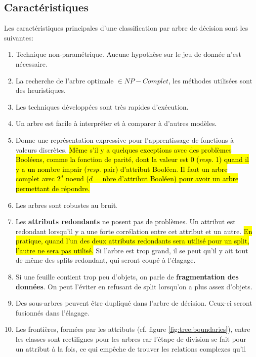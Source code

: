 \documentclass[letterpaper, 12pt]{article}
\newcommand{\alinea}{
\hspace*{0.5cm}}
\begin{document}
		\subsection{Caractéristiques}
			\alinea Les caractéristiques principales d'une classification
				par arbre de décision sont les suivantes:
			\begin{enumerate}
				\item Technique non-paramétrique. Aucune hypothèse sur le
					jeu de donnée n'est nécessaire.
				\item La recherche de l'arbre optimale $\in NP-Complet$,
					les méthodes utilisées sont des heuristiques.
				\item Les techniques développées sont très rapides 
					d'exécution.
				\item Un arbre est facile à interpréter et à comparer
					à d'autres modèles.
				\item Donne une représentation expressive pour l'apprentissage
					de fonctions à valeurs discrètes. \hl{Même s'il y a
					quelques exceptions avec des problèmes Booléens, comme
					la fonction de parité, dont la valeur est 0
					(\textit{resp.} 1) quand il y a un nombre impair 
					(\textit{resp.} pair) d'attribut Booléen. Il faut
					un arbre complet avec $2^d$ noeud ($d$ = nbre d'attribut
					Booléen) pour avoir un arbre permettant de répondre.}
				\item Les arbres sont robustes au bruit.
				\item Les \textbf{attributs redondants} ne posent pas 
					de problèmes. Un attribut est redondant lorsqu'il y a une
					forte corrélation entre cet attribut et un autre.
					\hl{En pratique, quand l'un des deux attributs redondants
					sera utilisé pour un split, l'autre ne sera pas utilisé.}
					Si l'arbre est trop grand, il se peut qu'il y ait tout
					de même des splits redondant, qui seront coupé à l'élagage.
				\item Si une feuille contient trop peu d'objets, on parle
					de \textbf{fragmentation des données}. On peut l'éviter
					en refusant de split lorsqu'on a plus assez d'objets.
				\item Des sous-arbres peuvent être dupliqué dans l'arbre
					de décision. Ceux-ci seront fusionnés dans l'élagage.
				\item Les frontières, formées par les attributs (cf. figure
					\ref{fig:tree:boundaries}), 
					entre les classes sont rectilignes pour les arbres car
					l'étape de division se fait pour un attribut à la fois,
					ce qui empêche de trouver les relations complexes qu'il

\end{enumerate}
\end{document}
